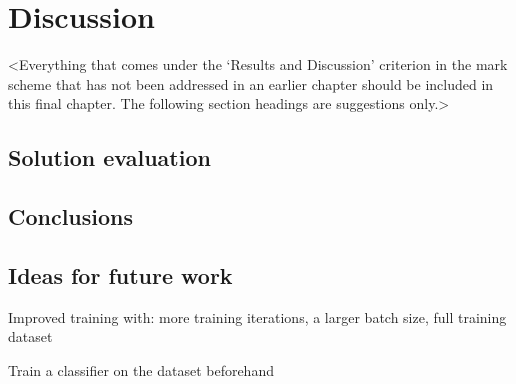 \chapter{Discussion}
\label{chapter4}

<Everything that comes under the `Results and Discussion' criterion in the mark scheme that has not been addressed in an earlier chapter should be included in this final chapter. The following section headings are suggestions only.>

\section{Solution evaluation}

\section{Conclusions}

\section{Ideas for future work}
Improved training with: more training iterations, a larger batch size, full training dataset

Train a classifier on the dataset beforehand
